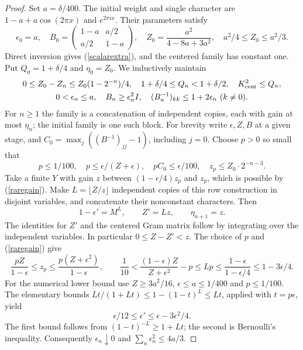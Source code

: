 \documentclass[reqno,a4paper,12pt]{amsart}
\begin{document}
\begin{proof}
Set $a=\delta/400$. The initial weight and single character are
$1-a+a\cos(2\pi x)$ and $e^{2\pi ix}$. Their parameters satisfy
\[
 \epsilon_0=a,\quad B_0=\begin{pmatrix}1-a&a/2\\a/2&1-a\end{pmatrix},
 \quad Z_0=\frac{a^2}{4-8a+3a^2},\quad a^2/4\le Z_0\le a^2/3.
\]
Direct inversion gives (\ref{scalarextra}), and the centered family has
constant one. Put $Q_0=1+\delta/4$ and $\eta_0=Z_0$.
We inductively maintain
\begin{gather*}
 0\le Z_0-Z_n\le Z_0(1-2^{-n})/4,\quad
 1+\delta/4\le Q_n<1+\delta/2,\quad K_{\rm cent}^2\le Q_n,\\
 0<\epsilon_n\le a,\quad B_n\ge\epsilon_n^2I,\quad
 (B_n^{-1})_{kk}\le1+2\epsilon_n\ (k\ne0).
\end{gather*}
For $n\ge1$ the family is a concatenation of independent copies,
each with gain at most $\eta_n$; the initial family is one such block.
For brevity write $\epsilon,Z,B$ at a given stage, and
$C_0=\max_j((B^{-1})_{jj}-1)$, including $j=0$.
Choose $p>0$ so small that
\[
 p\le1/100,\quad p\le\epsilon/(Z+\epsilon),\quad
 pC_0\le\epsilon/100,\quad z_p\le Z_0\cdot2^{-n-3}.
\]
Take a finite $Y$ with gain $z$ between $(1-\epsilon/4)z_p$ and $z_p$,
which is possible by (\ref{raregain}). Make $L=\lfloor Z/z\rfloor$
independent copies of this row construction in disjoint variables,
and concatenate their nonconstant characters. Then
\begin{equation}\label{scalarrecurrence}
 1-\epsilon'=M^L,\qquad Z'=Lz,\qquad \eta_{n+1}=z.
\end{equation}
The identities for $Z'$ and the centered Gram matrix follow by integrating
over the independent variables. In particular $0\le Z-Z'<z$.
The choice of $p$ and (\ref{raregain}) give
\[
 \frac{pZ}{1-\epsilon}\le z_p\le\frac{p(Z+\epsilon^2)}{1-\epsilon},
 \qquad
 \frac1{10}<\frac{(1-\epsilon)Z}{Z+\epsilon^2}-p
 \le Lp\le\frac{1-\epsilon}{1-\epsilon/4}\le1-3\epsilon/4.
\]
For the numerical lower bound use $Z\ge3a^2/16$, $\epsilon\le a\le1/400$
and $p\le1/100$. The elementary bounds
$Lt/(1+Lt)\le1-(1-t)^L\le Lt$, applied with $t=p\epsilon$, yield
\begin{equation}\label{epsrecurrence}
 \epsilon/12\le\epsilon'\le\epsilon-3\epsilon^2/4.
\end{equation}
The first bound follows from $(1-t)^{-L}\ge1+Lt$; the second is
Bernoulli's inequality. Consequently $\epsilon_n\downarrow0$ and
$\sum_n\epsilon_n^2\le4a/3$.


\end{proof}
\end{document}
